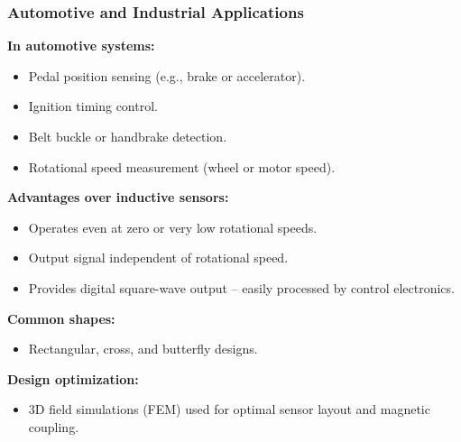 \begin{frame}
	\frametitle{Automotive and Industrial Applications}
    \small
    \textbf{In automotive systems:}
    \begin{itemize}
        \item Pedal position sensing (e.g., brake or accelerator).
        \item Ignition timing control.
        \item Belt buckle or handbrake detection.
        \item Rotational speed measurement (wheel or motor speed).
    \end{itemize}
    \textbf{Advantages over inductive sensors:}
    \begin{itemize}
        \item Operates even at zero or very low rotational speeds.
        \item Output signal independent of rotational speed.
        \item Provides digital square-wave output -- easily processed by control electronics.
    \end{itemize}
    \textbf{Common shapes:}
    \begin{itemize}
        \item Rectangular, cross, and butterfly designs.
    \end{itemize}
    \textbf{Design optimization:}
    \begin{itemize}
        \item 3D field simulations (FEM) used for optimal sensor layout and magnetic coupling.
    \end{itemize}
\end{frame}

